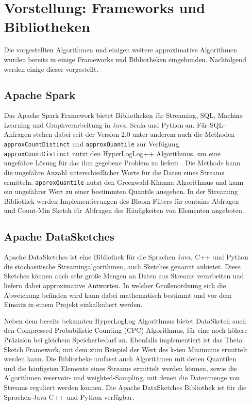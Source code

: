\section{Vorstellung: Frameworks und Bibliotheken}
Die vorgestellten Algorithmen und einigen weitere approximative Algorithmen wurden bereits in einige Frameworks und Bibliotheken eingebunden. Nachfolgend werden einige dieser vorgestellt.

\subsection{Apache Spark}
Das Apache Spark Framework bietet Bibliotheken für Streaming, SQL, Machine Learning und Graphverarbeitung in Java, Scala und Python an. 
Für SQL-Anfragen stehen dabei seit der Version 2.0 unter anderem auch die Methoden  \texttt{approxCountDistinct} 
und \texttt{approxQuantile} zur Verfügung. 
\texttt{approxCountDistinct} nutzt den HyperLogLog++ Algorithmus, 
um eine ungefähre Lösung für das ihm gegebene Problem zu liefern \cite{hunter2016}.
Die Methode kann die ungefähre Anzahl unterschiedlicher Worte für die Daten eines Streams ermitteln.
\texttt{approxQuantile} nutzt den Greenwald-Khanna Algorithmus \cite{greenwald2001} 
und kann ein ungefährer Wert zu einer bestimmten Quantile ausgeben.
In der Streaming Bibliothek werden Implementierungen des Bloom Filters für contains-Abfragen und Count-Min Sketch für Abfragen der Häufigkeiten von Elementen angeboten.


\subsection{Apache DataSketches}
Apache DataSketches ist eine Bibliothek für die Sprachen Java, C++ und Python die stochasitische Streamingalgorithmen, 
auch Sketches genannt anbietet. 
Diese Sketches können auch sehr große Mengen an Daten aus Streams verarbeiten 
und liefern dabei approximative Antworten. 
In welcher Größenordnung sich die Abweichung befinden wird kann dabei mathematisch bestimmt 
und vor dem Einsatz in einem Projekt einkalkuliert werden.

Neben dem bereits bekannten HyperLogLog Algorithmus bietet DataSketch auch den Compressed Probabilistic Counting (CPC) Algorithmus, 
für eine noch höhere Präzision bei gleichem Speicherbedarf an.
Ebenfalls implementiert ist das Theta Sketch Framework, 
mit dem zum Beispiel der Wert des k-ten Minimums ermittelt werden kann.
Die Bibliotheke umfasst auch Algorithmen mit denen Quantilen und die häufigsten Elemente eines Streams ermittelt werden können, 
sowie die Algorithmen reservoir- und weighted-Sampling, mit denen die Datenmenge von Streams reguliert werden können.
Die Apache DataSketches Bibliothek ist für die Sprachen Java C++ und Python verfügbar.


